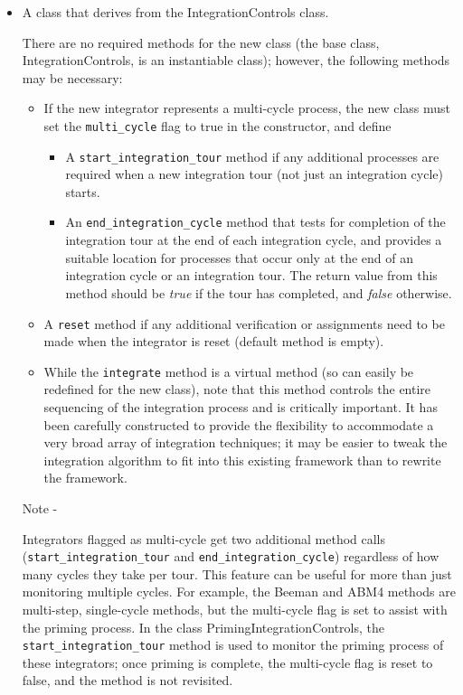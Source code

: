 \begin{itemize}
\item A class that derives from the IntegrationControls class.

There are no required methods for the new class (the base class, 
IntegrationControls, is an instantiable class); however, the following methods 
may be necessary:
\begin{itemize}
 \item If the new 
integrator represents a multi-cycle process, the new class must set the 
\verb+multi_cycle+ flag to true in the constructor, and define
\begin{itemize}
 \item A \verb+start_integration_tour+ method if any additional processes are 
 required when a new integration tour (not just an 
 integration cycle) starts.
 \item An \verb+end_integration_cycle+ method that tests for completion of the 
 integration tour at the end of each integration cycle, and provides a 
 suitable 
 location for processes that occur only at the end of an integration cycle or 
 an integration tour.  The return value from this method should be 
 \textit{true} if the tour has completed, and \textit{false} otherwise. 
\end{itemize}
\item  A \verb+reset+ method if any additional verification or assignments 
need to be made when the integrator is reset (default method is empty).
\item While the \verb+integrate+ method is a virtual method (so can easily be 
redefined for the new class), note that this method controls the entire 
sequencing of the integration process and is critically important.  It has 
been carefully constructed to provide the flexibility to accommodate a very 
broad array of integration techniques; it may be easier to tweak the 
integration algorithm to fit into this existing framework than to rewrite the 
framework.

\end{itemize}

 Note -

Integrators flagged as multi-cycle get two additional method calls 
(\verb+start_integration_tour+ and \verb+end_integration_cycle+) regardless of 
how many cycles they take per tour.  This feature can be useful for more than 
just monitoring multiple cycles. For example, the Beeman and ABM4 methods are 
multi-step, single-cycle methods, but the multi-cycle flag is set to 
assist with the priming process.  In the class PrimingIntegrationControls, the 
\verb+start_integration_tour+ method is used to monitor the priming process of 
these integrators; once priming is complete, the multi-cycle flag is reset to 
false, and the method is not revisited.


\end{itemize}
